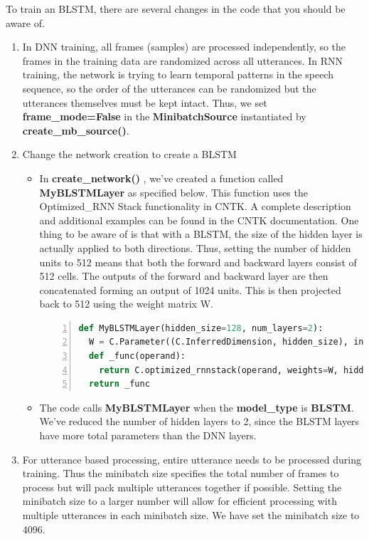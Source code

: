 To train an BLSTM, there are several changes in the code that you should be aware of.
\begin{enumerate}
  \item In DNN training, all frames (samples) are processed independently, so the frames in the training data are randomized across all utterances. In RNN training, the network is trying to learn temporal patterns in the speech sequence, so the order of the utterances can be randomized but the utterances themselves must be kept intact. Thus, we set {\bf frame\_mode=False} in the {\bf MinibatchSource} instantiated by {\bf create\_mb\_source()}.
  \item Change the network creation to create a BLSTM
    \begin{itemize}
      \item In {\bf create\_network()} , we've created a function called {\bf MyBLSTMLayer} as specified below. This function uses the Optimized\_RNN Stack functionality in CNTK. A complete description and additional examples can be found in the CNTK documentation. One thing to be aware of is that with a BLSTM, the size of the hidden layer is actually applied to both directions. Thus, setting the number of hidden units to 512 means that both the forward and backward layers consist of 512 cells. The outputs of the forward and backward layer are then concatenated forming an output of 1024 units. This is then projected back to 512 using the weight matrix W.
\begin{lstlisting}[language = python, numbers=left, 
   numberstyle=\tiny,keywordstyle=\color{blue!70},
   commentstyle=\color{red!50!green!50!blue!50},frame=shadowbox,
   rulesepcolor=\color{red!20!green!20!blue!20},basicstyle=\ttfamily]
def MyBLSTMLayer(hidden_size=128, num_layers=2): 
  W = C.Parameter((C.InferredDimension, hidden_size), init=C.he_normal(1.0), name='rnn_parameters') 
  def _func(operand): 
    return C.optimized_rnnstack(operand, weights=W, hidden_size=hidden_size, num_layers=num_layers, bidirectional=True, recurrent_op='lstm') 
  return _func
\end{lstlisting}
      \item The code calls {\bf MyBLSTMLayer} when the {\bf model\_type} is {\bf BLSTM}. We've reduced the number of hidden layers to 2, since the BLSTM layers have more total parameters than the DNN layers.
    \end{itemize}
  \item For utterance based processing, entire utterance needs to be processed during training. Thus the minibatch size specifies the total number of frames to process but will pack multiple utterances together if possible. Setting the minibatch size to a larger number will allow for efficient processing with multiple utterances in each minibatch size. We have set the minibatch size to 4096.
\end{enumerate}

